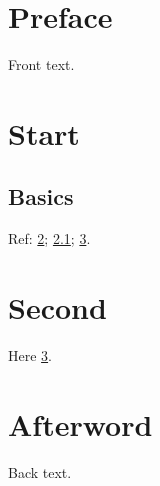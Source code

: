 \documentclass{memoir}
\begin{document}
\frontmatter
\chapter{Preface}\label{preface}
Front text.
\tableofcontents*
\mainmatter
\chapter{Start}\label{start}
\section{Basics}\label{basics}
Ref: \ref{start}; \ref{basics}; \ref{second}.
\chapter{Second}\label{second}
Here \ref{second}.
\backmatter
\chapter{Afterword}\label{afterword}
Back text.
\end{document}
